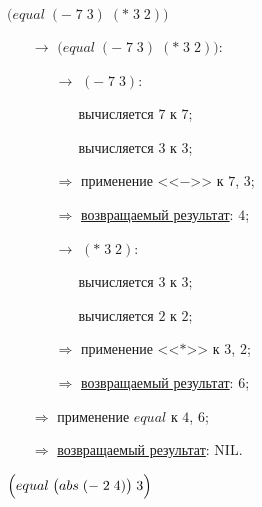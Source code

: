 \problem $\bigl(equal\; (-\; 7\; 3)\; (*\; 3\; 2) \bigr)$

\begin{itemize}
	\item[$\longrightarrow$] $\bigl(equal\; (-\; 7\; 3)\; (*\; 3\; 2) \bigr)$:
	\begin{itemize}
		\item[$\longrightarrow$] $(-\; 7\; 3)$:
		\begin{itemize}
			\item[\textbullet] вычисляется $7$ к $7$;
			\item[\textbullet] вычисляется $3$ к $3$;
		\end{itemize}
		\item[$\Longrightarrow$] применение <<$-$>> к $7$, $3$;
		\item[$\Longrightarrow$] \underline{возвращаемый результат}: $4$;
		\item[$\longrightarrow$] $(*\; 3\; 2)$:
		\begin{itemize}
			\item[\textbullet] вычисляется $3$ к $3$;
			\item[\textbullet] вычисляется $2$ к $2$;
		\end{itemize}
		\item[$\Longrightarrow$] применение <<$*$>> к $3$, $2$;
		\item[$\Longrightarrow$] \underline{возвращаемый результат}: $6$;
	\end{itemize}
	\item[$\Longrightarrow$] применение $equal$ к $4$, $6$;
	\item[$\Longrightarrow$] \underline{возвращаемый результат}: NIL.
\end{itemize}
\vfill

\newpage
\problem $\Bigl(equal\; \bigl(abs\; (-\; 2\; 4)\bigr)\; 3\Bigr)$


